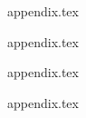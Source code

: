 \newpage

\begin{appendices}


{appendix.tex}

{appendix.tex}

{appendix.tex}

{appendix.tex}



\end{appendices}
% 
